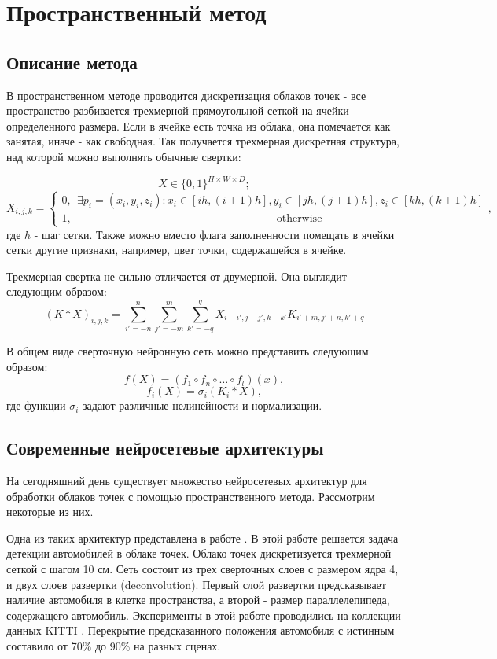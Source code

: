 \documentclass[]{article}
\begin{document}
\section{Пространственный метод}

\subsection{Описание метода}

В пространственном методе проводится 
дискретизация облаков точек - все пространство разбивается трехмерной прямоугольной сеткой на ячейки определенного размера. Если в ячейке есть точка из облака, она помечается как занятая, иначе - как свободная. Так получается трехмерная дискретная структура, над которой можно выполнять обычные свертки:

$$X \in \{0, 1\}^{H \times W \times D};$$
$$X_{i,j,k} = \begin{cases}
0,\ \ \exists p_i = (x_i, y_i, z_i): x_i \in [ih,(i+1)h], y_i \in [jh,(j+1)h], z_i \in [kh,(k+1)h]\\
1,\ \ \ \ \ \ \ \ \ \ \ \ \ \ \ \ \ \ \ \ \ \ \ \ \  \ \ \ \ \ \ \ \ \ \ \ \ \ \ \ \ \ \ \ \ \ \ \ \ \ \ \ \ \ \  \ \ \ \ \ \ \ \ \ \ \ \ \ \ \ \ \ \ \ \ \ \ \ \ \ \ \ \ \ \text{otherwise}
\end{cases},$$
где $h$ - шаг сетки. Также можно вместо флага заполненности помещать в ячейки сетки другие признаки, например, цвет точки, содержащейся в ячейке.

Трехмерная свертка не сильно отличается от двумерной. Она выглядит следующим образом:
$$(K*X)_{i,j,k} = \sum\limits_{i'=-n}^n \sum\limits_{j'=-m}^m \sum\limits_{k'=-q}^q X_{i-i',j-j',k-k'} K_{i'+m,j'+n,k'+q}$$

В общем виде сверточную нейронную сеть можно представить следующим образом:
$$f(X) = (f_1 \circ f_n \circ \dots \circ f_l)(x),$$
$$f_i(X) = \sigma_i(K_i * X),$$
где функции $\sigma_i$ задают различные нелинейности и нормализации.

\subsection{Современные нейросетевые архитектуры}

На сегодняшний день существует множество нейросетевых архитектур для обработки облаков точек с помощью пространственного метода. Рассмотрим некоторые из них. 

Одна из таких архитектур представлена в работе \cite{li20173d}. В этой работе решается задача детекции автомобилей в облаке точек. Облако точек дискретизуется трехмерной сеткой с шагом 10 см. Сеть состоит из трех сверточных слоев с размером ядра 4, и двух слоев развертки (deconvolution). Первый слой развертки предсказывает наличие автомобиля в клетке пространства, а второй - размер параллелепипеда, содержащего автомобиль. Эксперименты в этой работе проводились на коллекции данных KITTI \cite{geiger2013vision}. Перекрытие предсказанного положения автомобиля с истинным составило от 70\% до 90\% на разных сценах.
\end{document}
